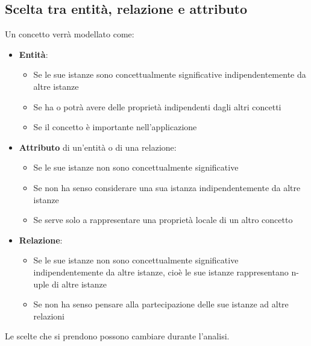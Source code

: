 \documentclass[12pt]{article}
\begin{document}
\subsection{Scelta tra entità, relazione e attributo}
Un concetto verrà modellato come:
\begin{itemize}
    \item \textbf{Entità}:
    \begin{itemize}
        \item Se le sue istanze sono concettualmente significative indipendentemente da altre istanze
        \item Se ha o potrà avere delle proprietà indipendenti dagli altri concetti
        \item Se il concetto è importante nell'applicazione
    \end{itemize}
    \item \textbf{Attributo} di un'entità o di una relazione:
    \begin{itemize}
        \item Se le sue istanze non sono concettualmente significative
        \item Se non ha senso considerare una sua istanza indipendentemente da altre istanze
        \item Se serve solo a rappresentare una proprietà locale di un altro concetto
    \end{itemize}
    \item \textbf{Relazione}:
    \begin{itemize}
        \item Se le sue istanze non sono concettualmente significative indipendentemente da altre istanze, cioè le sue istanze rappresentano n-uple di altre istanze
        \item Se non ha senso pensare alla partecipazione delle sue istanze ad altre relazioni
    \end{itemize}
\end{itemize}
Le scelte che si prendono possono cambiare durante l'analisi.
\end{document}

